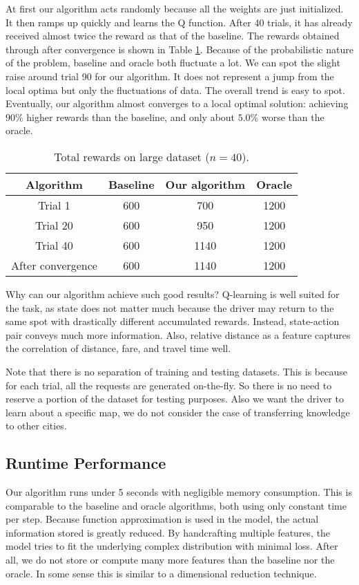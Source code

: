 \documentclass{article}
\begin{document}
At first our algorithm acts randomly because all the weights are just initialized. It then ramps up quickly and learns the Q function. After 40 trials, it has already received almost twice the reward as that of the baseline. The rewards obtained through after convergence is shown in Table \ref{tbl:reward}. Because of the probabilistic nature of the problem, baseline and oracle both fluctuate a lot. We can spot the slight raise around trial 90 for our algorithm. It does not represent a jump from the local optima but only the fluctuations of data. The overall trend is easy to spot. Eventually, our algorithm almost converges to a local optimal solution: achieving $90\%$ higher rewards than the baseline, and only about $5.0\%$ worse than the oracle.

\begin{table}[!htb]
\caption{Total rewards on large dataset ($n=40$).}
\label{tbl:reward}
\centering
\begin{tabular}{c|ccc}
\hline
Algorithm & Baseline & Our algorithm & Oracle \\\hline
Trial 1 & 600 & 700 & 1200 \\
Trial 20 & 600 & 950 & 1200 \\
Trial 40 & 600 & 1140 & 1200 \\
After convergence & 600 & 1140 & 1200
\end{tabular}
\end{table}

Why can our algorithm achieve such good results? Q-learning is well suited for the task, as state does not matter much because the driver may return to the same spot with drastically different accumulated rewards. Instead, state-action pair conveys much more information. Also, relative distance as a feature captures the correlation of distance, fare, and travel time well.

Note that there is no separation of training and testing datasets. This is because for each trial, all the requests are generated on-the-fly. So there is no need to reserve a portion of the dataset for testing purposes. Also we want the driver to learn about a specific map, we do not consider the case of transferring knowledge to other cities.

\subsection{Runtime Performance}

Our algorithm runs under 5 seconds with negligible memory consumption. This is comparable to the baseline and oracle algorithms, both using only constant time per step. Because function approximation is used in the model, the actual information stored is greatly reduced. By handcrafting multiple features, the model tries to fit the underlying complex distribution with minimal loss. After all, we do not store or compute many more features than the baseline nor the oracle. In some sense this is similar to a dimensional reduction technique.
\end{document}
